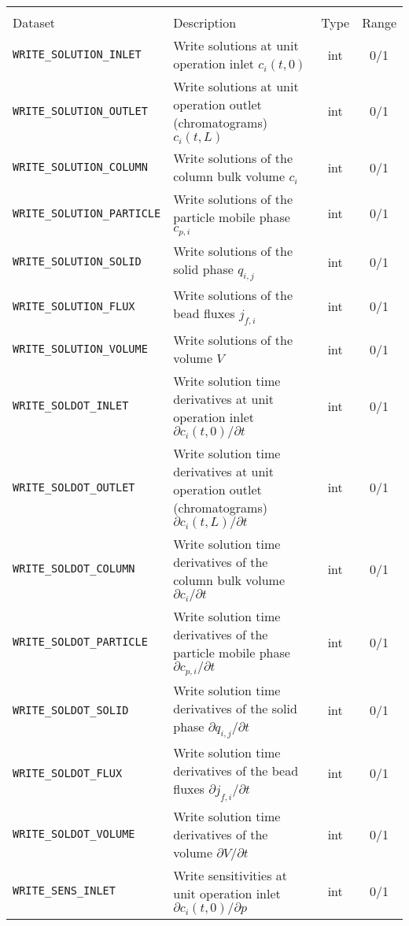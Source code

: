 \begin{table}[!ht]
\footnotesize
\begin{tabu}to \linewidth[m]{lX[m]cc} \toprule
{} \\
\rowfont[c]\normalfont Dataset & Description & Type & Range \everyrow{\midrule}\\
\texttt{WRITE\_SOLUTION\_INLET} & Write solutions at unit operation inlet $c_i(t,0)$ & int & 0/1 \\
\texttt{WRITE\_SOLUTION\_OUTLET} & Write solutions at unit operation outlet (chromatograms) $c_i(t,L)$ & int & 0/1 \\
\texttt{WRITE\_SOLUTION\_COLUMN} & Write solutions of the column bulk volume $c_i$ & int & 0/1 \\
\texttt{WRITE\_SOLUTION\_PARTICLE} & Write solutions of the particle mobile phase $c_{p,i}$ & int & 0/1 \\
\texttt{WRITE\_SOLUTION\_SOLID} & Write solutions of the solid phase $q_{i,j}$ & int & 0/1 \\
\texttt{WRITE\_SOLUTION\_FLUX} & Write solutions of the bead fluxes $j_{f,i}$ & int & 0/1 \\
\texttt{WRITE\_SOLUTION\_VOLUME} & Write solutions of the volume $V$ & int & 0/1 \\
\texttt{WRITE\_SOLDOT\_INLET} & Write solution time derivatives at unit operation inlet $\partial c_i(t,0) / \partial t$ & int & 0/1 \\
\texttt{WRITE\_SOLDOT\_OUTLET} & Write solution time derivatives at unit operation outlet (chromatograms) $\partial c_i(t,L) / \partial t$ & int & 0/1 \\
\texttt{WRITE\_SOLDOT\_COLUMN} & Write solution time derivatives of the column bulk volume $\partial c_i / \partial t$ & int & 0/1 \\
\texttt{WRITE\_SOLDOT\_PARTICLE} & Write solution time derivatives of the particle mobile phase $\partial c_{p,i} / \partial t$ & int & 0/1 \\
\texttt{WRITE\_SOLDOT\_SOLID} & Write solution time derivatives of the solid phase $\partial q_{i,j} / \partial t$ & int & 0/1 \\
\texttt{WRITE\_SOLDOT\_FLUX} & Write solution time derivatives of the bead fluxes $\partial j_{f,i} / \partial t$ & int & 0/1 \\
\texttt{WRITE\_SOLDOT\_VOLUME} & Write solution time derivatives of the volume $\partial V / \partial t$ & int & 0/1 \\
\texttt{WRITE\_SENS\_INLET} & Write sensitivities at unit operation inlet $\partial c_i(t,0) / \partial p$ & int & 0/1 \\

\end{tabu}
\end{table}
